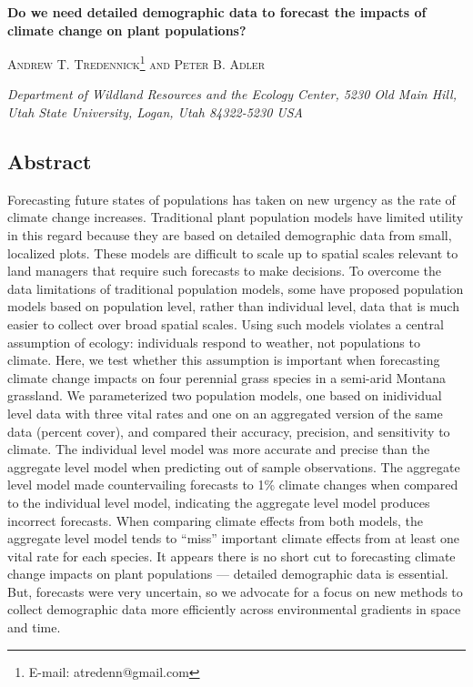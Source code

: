 \documentclass[12pt,]{article}
\author{}
\date{}
\begin{document}
\normalsize


\begin{centering}
\textbf{\large{Do we need detailed demographic data to forecast the impacts of climate change on plant populations?}}

\textsc{\small{Andrew T. Tredennick\footnote{E-mail: atredenn@gmail.com} and Peter B. Adler}}

\textit{\small{Department of Wildland Resources and the Ecology Center, 5230 Old Main Hill, Utah State University, Logan, Utah 84322-5230 USA}}

\end{centering}

\subsection{Abstract}\label{abstract}

Forecasting future states of populations has taken on new urgency as the
rate of climate change increases. Traditional plant population models
have limited utility in this regard because they are based on detailed
demographic data from small, localized plots. These models are difficult
to scale up to spatial scales relevant to land managers that require
such forecasts to make decisions. To overcome the data limitations of
traditional population models, some have proposed population models
based on population level, rather than individual level, data that is
much easier to collect over broad spatial scales. Using such models
violates a central assumption of ecology: individuals respond to
weather, not populations to climate. Here, we test whether this
assumption is important when forecasting climate change impacts on four
perennial grass species in a semi-arid Montana grassland. We
parameterized two population models, one based on inidividual level data
with three vital rates and one on an aggregated version of the same data
(percent cover), and compared their accuracy, precision, and sensitivity
to climate. The individual level model was more accurate and precise
than the aggregate level model when predicting out of sample
observations. The aggregate level model made countervailing forecasts to
1\% climate changes when compared to the individual level model,
indicating the aggregate level model produces incorrect forecasts. When
comparing climate effects from both models, the aggregate level model
tends to ``miss'' important climate effects from at least one vital rate
for each species. It appears there is no short cut to forecasting
climate change impacts on plant populations --- detailed demographic
data is essential. But, forecasts were very uncertain, so we advocate
for a focus on new methods to collect demographic data more efficiently
across environmental gradients in space and time.
\end{document}
